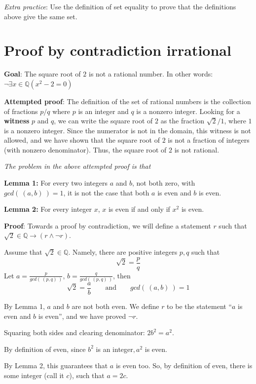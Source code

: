 \documentclass[12pt, oneside]{article}
\begin{document}
{\it Extra practice}: Use the definition of set equality to prove that the definitions above  give the same set.

 \vfill
\section*{Proof by contradiction irrational}


{\bf Goal}:  The square root of $2$ is not a rational number.  In other words: $\neg \exists x \in \mathbb{Q} ( x^2 -  2 = 0)$

{\bf Attempted proof}: The definition of the set of rational numbers is the collection of fractions $p/q$ where $p$ is an integer and $q$ is a nonzero integer. Looking for a {\bf witness} $p$ and $q$, we can write the square root of $2$ as the fraction 
$\sqrt{2 }/1$, where $1$ is a nonzero integer. Since the numerator is not in the domain, this witness is not allowed, and we have shown that the square root of $2$ is not a fraction of integers (with nonzero denominator). Thus, the square root of $2$ is not rational.


{\it The problem in the above attempted proof is that} \underline{\phantom{it only considers one candidate witness
and does not prove that no witnesses exist.}}


{\bf Lemma 1:} For every two integers $a$ and  $b$, not both zero, with  $gcd(~(a,b)~) = 1$, it is not the case that both $a$
is  even and $b$ is even.


{\bf Lemma 2:} For every integer  $x$, $x$ is  even if and only if $x^2$  is even.


{\bf Proof}: Towards a proof by contradiction, we will define a statement 
$r$ such that $\sqrt{2} \in \mathbb{Q} \to (r \land \lnot r)$. 

Assume that $\sqrt{2} \in \mathbb{Q}$. Namely, there are positive integers
$p, q$ such that 
\[
    \sqrt{2} = \frac{p}{q}
\]
Let $a= \frac{p}{gcd( ~(p,q)~)}$, $b = \frac{q}{gcd(~(p,q)~)}$, then 
\[
    \sqrt{2} = \frac{a}{b} \qquad \text{and} \qquad gcd(~(a,b)~) = 1
\]

By Lemma 1, $a$ and $b$ are not both even. We define $r$ to be the 
statement ``$a$ is even and $b$ is even'', and we have proved $\lnot r$.

Squaring both sides and clearing denominator: $2b^2 = a^2$.

By definition of even, since $b^2$ is an integer$, a^2$ is even.

By Lemma 2, this guarantees that $a$ is even too. So, by 
definition of even, there is some integer (call it $c$), such that $a = 2c$.
\end{document}
